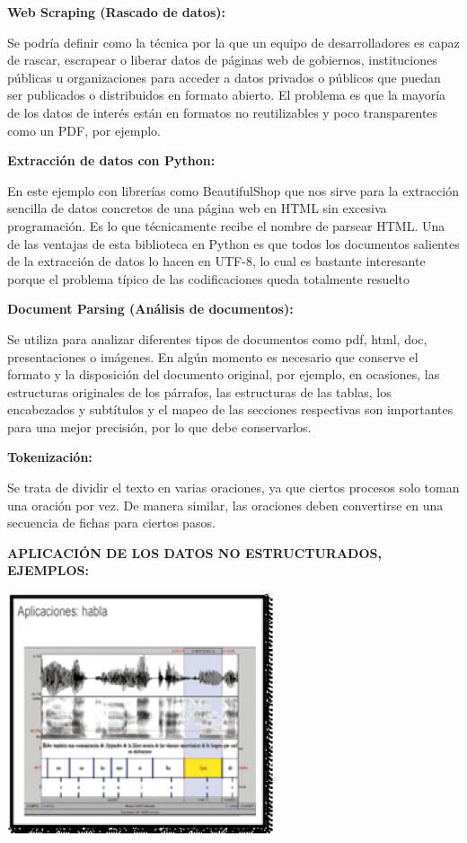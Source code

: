\documentclass{article} %
\begin{document}
\noindent \textbf{Web Scraping (Rascado de datos): }

\noindent Se podr\'{i}a definir como la t\'{e}cnica por la que un equipo de desarrolladores es capaz de rascar, escrapear o liberar datos de p\'{a}ginas web de gobiernos, instituciones p\'{u}blicas u organizaciones para acceder a datos privados o p\'{u}blicos que puedan ser publicados o distribuidos en formato abierto. El problema es que la mayor\'{i}a de los datos de inter\'{e}s est\'{a}n en formatos no reutilizables y poco transparentes como un PDF, por ejemplo.

\noindent \textbf{Extracci\'{o}n de datos con Python:}

\noindent En este ejemplo con librer\'{i}as como BeautifulShop que nos sirve para la extracci\'{o}n sencilla de datos concretos de una p\'{a}gina web en HTML sin excesiva programaci\'{o}n. Es lo que t\'{e}cnicamente recibe el nombre de parsear HTML. Una de las ventajas de esta biblioteca en Python es que todos los documentos salientes de la extracci\'{o}n de datos lo hacen en UTF-8, lo cual es bastante interesante porque el problema t\'{i}pico de las codificaciones queda totalmente resuelto

\noindent \textbf{Document Parsing (An\'{a}lisis de documentos):}

\noindent Se utiliza para analizar diferentes tipos de documentos como pdf, html, doc, presentaciones o im\'{a}genes. En alg\'{u}n momento es necesario que conserve el formato y la disposici\'{o}n del documento original, por ejemplo, en ocasiones, las estructuras originales de los p\'{a}rrafos, las estructuras de las tablas, los encabezados y subt\'{i}tulos y el mapeo de las secciones respectivas son importantes para una mejor precisi\'{o}n, por lo que debe conservarlos.

\noindent \textbf{Tokenizaci\'{o}n: }

\noindent Se trata de dividir el texto en varias oraciones, ya que ciertos procesos solo toman una oraci\'{o}n por vez. De manera similar, las oraciones deben convertirse en una secuencia de fichas para ciertos pasos.

\noindent \textbf{APLICACI\'{O}N DE LOS DATOS NO ESTRUCTURADOS, EJEMPLOS:}

\noindent 

\noindent \textbf{\includegraphics*[width=3.10in, height=2.82in, keepaspectratio=false]{image6}}
\end{document}
